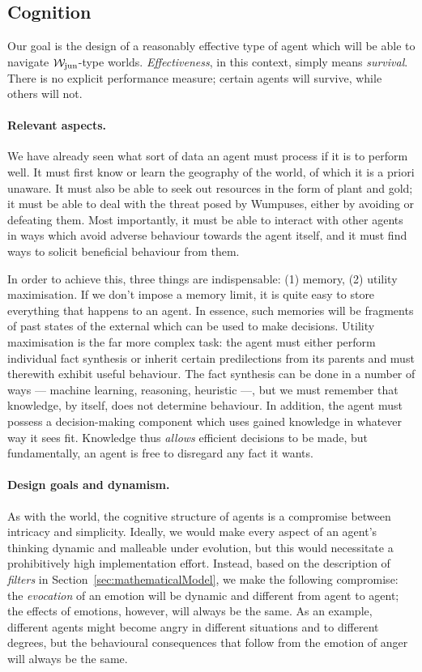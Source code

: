 \subsection{Cognition}

Our goal is the design of a reasonably effective type of agent which will be able to navigate $\mathcal{W}_{\mathrm{jun}}$-type worlds. \emph{Effectiveness}, in this context, simply means \emph{survival}. There is no explicit performance measure; certain agents will survive, while others will not.

\paragraph{Relevant aspects.} We have already seen what sort of data an agent must process if it is to perform well. It must first know or learn the geography of the world, of which it is a priori unaware. It must also be able to seek out resources in the form of plant and gold; it must be able to deal with the threat posed by Wumpuses, either by avoiding or defeating them. Most importantly, it must be able to interact with other agents in ways which avoid adverse behaviour towards the agent itself, and it must find ways to solicit beneficial behaviour from them.

In order to achieve this, three things are indispensable: (1) memory, (2) utility maximisation. If we don't impose a memory limit, it is quite easy to store everything that happens to an agent. In essence, such memories will be fragments of past states of the external which can be used to make decisions. Utility maximisation is the far more complex task: the agent must either perform individual fact synthesis or inherit certain predilections from its parents and must therewith exhibit useful behaviour. The fact synthesis can be done in a number of ways --- machine learning, reasoning, heuristic ---, but we must remember that knowledge, by itself, does not determine behaviour. In addition, the agent must possess a decision-making component which uses gained knowledge in whatever way it sees fit. Knowledge thus  {\em allows} efficient decisions to be made, but fundamentally, an agent is free to disregard any fact it wants.

\paragraph{Design goals and dynamism.} As with the world, the cognitive structure of agents is a compromise between intricacy and simplicity. Ideally, we would make every aspect of an agent's thinking dynamic and malleable under evolution, but this would necessitate a prohibitively high implementation effort. Instead, based on the description of \emph{filters} in Section~\ref{sec:mathematicalModel}, we make the following compromise: the {\em evocation} of an emotion will be dynamic and different from agent to agent; the effects of emotions, however, will always be the same. As an example, different agents might become angry in different situations and to different degrees, but the behavioural consequences that follow from the emotion of anger will always be the same.

